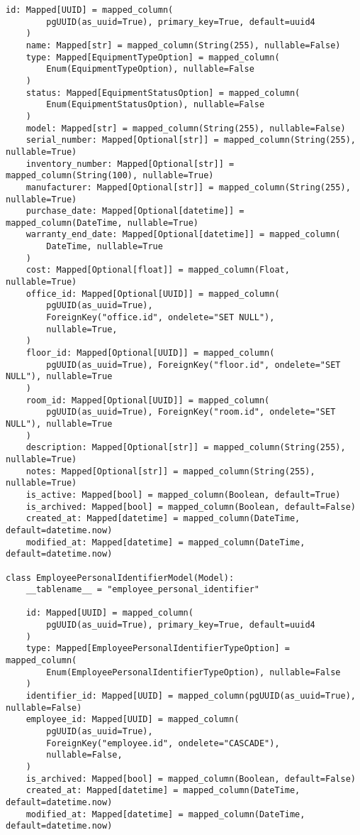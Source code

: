 \begin{lstlisting}[style=pythonstyle]
    id: Mapped[UUID] = mapped_column(
        pgUUID(as_uuid=True), primary_key=True, default=uuid4
    )
    name: Mapped[str] = mapped_column(String(255), nullable=False)
    type: Mapped[EquipmentTypeOption] = mapped_column(
        Enum(EquipmentTypeOption), nullable=False
    )
    status: Mapped[EquipmentStatusOption] = mapped_column(
        Enum(EquipmentStatusOption), nullable=False
    )
    model: Mapped[str] = mapped_column(String(255), nullable=False)
    serial_number: Mapped[Optional[str]] = mapped_column(String(255), nullable=True)
    inventory_number: Mapped[Optional[str]] = mapped_column(String(100), nullable=True)
    manufacturer: Mapped[Optional[str]] = mapped_column(String(255), nullable=True)
    purchase_date: Mapped[Optional[datetime]] = mapped_column(DateTime, nullable=True)
    warranty_end_date: Mapped[Optional[datetime]] = mapped_column(
        DateTime, nullable=True
    )
    cost: Mapped[Optional[float]] = mapped_column(Float, nullable=True)
    office_id: Mapped[Optional[UUID]] = mapped_column(
        pgUUID(as_uuid=True),
        ForeignKey("office.id", ondelete="SET NULL"),
        nullable=True,
    )
    floor_id: Mapped[Optional[UUID]] = mapped_column(
        pgUUID(as_uuid=True), ForeignKey("floor.id", ondelete="SET NULL"), nullable=True
    )
    room_id: Mapped[Optional[UUID]] = mapped_column(
        pgUUID(as_uuid=True), ForeignKey("room.id", ondelete="SET NULL"), nullable=True
    )
    description: Mapped[Optional[str]] = mapped_column(String(255), nullable=True)
    notes: Mapped[Optional[str]] = mapped_column(String(255), nullable=True)
    is_active: Mapped[bool] = mapped_column(Boolean, default=True)
    is_archived: Mapped[bool] = mapped_column(Boolean, default=False)
    created_at: Mapped[datetime] = mapped_column(DateTime, default=datetime.now)
    modified_at: Mapped[datetime] = mapped_column(DateTime, default=datetime.now)

class EmployeePersonalIdentifierModel(Model):
    __tablename__ = "employee_personal_identifier"

    id: Mapped[UUID] = mapped_column(
        pgUUID(as_uuid=True), primary_key=True, default=uuid4
    )
    type: Mapped[EmployeePersonalIdentifierTypeOption] = mapped_column(
        Enum(EmployeePersonalIdentifierTypeOption), nullable=False
    )
    identifier_id: Mapped[UUID] = mapped_column(pgUUID(as_uuid=True), nullable=False)
    employee_id: Mapped[UUID] = mapped_column(
        pgUUID(as_uuid=True),
        ForeignKey("employee.id", ondelete="CASCADE"),
        nullable=False,
    )
    is_archived: Mapped[bool] = mapped_column(Boolean, default=False)
    created_at: Mapped[datetime] = mapped_column(DateTime, default=datetime.now)
    modified_at: Mapped[datetime] = mapped_column(DateTime, default=datetime.now)


\end{lstlisting}
